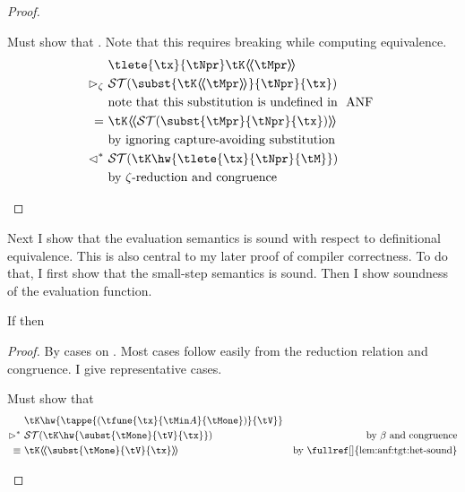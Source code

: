 {\begin{proof}
\begin{proofcases}
      Must show that \im{\tlete{\tx}{\tNpr}\tK\hhw{\tMpr} \equiv \sbound{\tK\hw{\tlete{\tx}{\tNpr}{\tM}}}}.
      Note that this requires breaking  while computing equivalence.
      \begin{align}
        &\tlete{\tx}{\tNpr}\tK\hhw{\tMpr} \nonumber \\
        \step_{\zeta}~& \sbound{\subst{\tK\hhw\tMpr}{\tNpr}{\tx}} \\
        &\text{note that this substitution is undefined in \tech{ANF}} \nonumber \\
        =~& \tK\hhw{\sbound{\subst{\tMpr}{\tNpr}{\tx}}} \\
        &\text{by ignoring capture-avoiding substitution} \nonumber \\
        \vartriangleleft^*~& \sbound{\tK\hw{\tlete{\tx}{\tNpr}{\tM}}} \\
        & \text{by \(\zeta\)-reduction and congruence} \nonumber \qedhere
      \end{align}
  \end{proofcases}
\end{proof}

Next I show that the  evaluation semantics is sound with respect to
definitional equivalence.
This is also central to my later proof of compiler correctness.
To do that, I first show that the small-step semantics is sound.
Then I show soundness of the evaluation function.
\begin{lemma}
  \label{lem:anf:tgt:step-sound}
  If \im{\tstepjudg[\mapsto]{}{\tM}{\tMpr}} then \im{\sequivjudg{}{\tM}{\tMpr}}
\end{lemma}
\begin{proof}
  By cases on \im{\tstepjudg[\mapsto]{}{\tM}{\tMpr}}.
  Most cases follow easily from the \slang reduction relation and congruence.
  I give representative cases.
  \begin{proofcases}
    \item \im{\tK\hw{\tappe{(\tfune{\tx}{\tA}{\tMone})}{\tV}} \mapsto_{\beta} \tK\hhw{\subst{\tMone}{\tV}{\tx}}}

      Must show that \im{\tK\hw{\tappe{(\tfune{\tx}{\tA}{\tMone})}{\tV}} \equiv \tK\hhw{\subst{\tMone}{\tV}{\tx}}}
      \begin{align}
        & \tK\hw{\tappe{(\tfune{\tx}{\tA}{\tMone})}{\tV}} \nonumber \\
        \stepstar~& \sbound{\tK\hw{\subst{\tMone}{\tV}{\tx}}} & \text{by \(\beta\) and congruence} \\
        \equiv~& \tK\hhw{\subst{\tMone}{\tV}{\tx}}  & \text{by \fullref[]{lem:anf:tgt:het-sound}}
      \end{align}


\end{proofcases}
\end{proof}}
